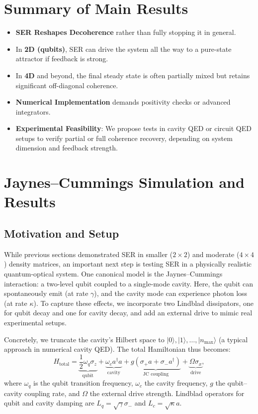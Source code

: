 \documentclass{article}
\begin{document}
\section{Summary of Main Results}
\begin{itemize}
\item \textbf{SER Reshapes Decoherence} rather than fully stopping it in general.
\item In \textbf{2D (qubits)}, SER can drive the system all the way to a pure-state attractor if feedback is strong.
\item In \textbf{4D} and beyond, the final steady state is often partially mixed but retains significant off-diagonal coherence.
\item \textbf{Numerical Implementation} demands positivity checks or advanced integrators.
\item \textbf{Experimental Feasibility}: We propose tests in cavity QED or circuit QED setups to verify partial or full coherence recovery, depending on system dimension and feedback strength.
\end{itemize}

\section{Jaynes--Cummings Simulation and Results}

\subsection{Motivation and Setup}
While previous sections demonstrated SER in smaller ($2\times 2$) and moderate ($4\times 4$) density matrices, an important next step is testing SER in a physically realistic quantum-optical system. One canonical model is the Jaynes--Cummings interaction: a two-level qubit coupled to a single-mode cavity. Here, the qubit can spontaneously emit (at rate $\gamma$), and the cavity mode can experience photon loss (at rate $\kappa$). To capture these effects, we incorporate two Lindblad dissipators, one for qubit decay and one for cavity decay, and add an external drive to mimic real experimental setups.

Concretely, we truncate the cavity’s Hilbert space to $\lvert 0 \rangle, \lvert 1 \rangle, \dots, \lvert n_{\text{max}} \rangle$ (a typical approach in numerical cavity QED). The total Hamiltonian thus becomes:
\[
H_{\text{total}} = \underbrace{\frac{1}{2} \omega_q \sigma_z}_{\text{qubit}} + \underbrace{\omega_c a^\dagger a}_{\text{cavity}} + \underbrace{g (\sigma_+ a + \sigma_- a^\dagger)}_{\text{JC coupling}} + \underbrace{\Omega \sigma_x}_{\text{drive}},
\]
where $\omega_q$ is the qubit transition frequency, $\omega_c$ the cavity frequency, $g$ the qubit--cavity coupling rate, and $\Omega$ the external drive strength. Lindblad operators for qubit and cavity damping are $L_q = \sqrt{\gamma} \sigma_-$ and $L_c = \sqrt{\kappa} a$.
\end{document}
